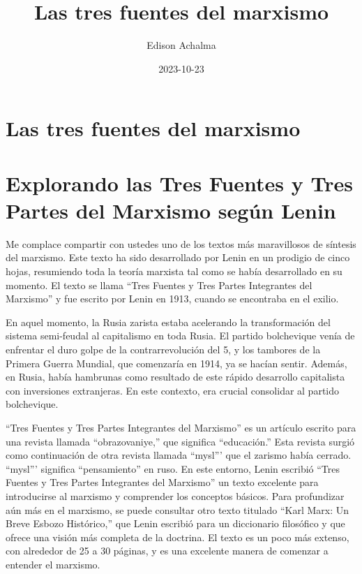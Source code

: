 \documentclass[
  jou,
  floatsintext,
  longtable,
  a4paper,
  nolmodern,
  notxfonts,
  notimes,
  12pt,
  colorlinks=true,linkcolor=blue,citecolor=blue,urlcolor=blue]{apa7}
\title{Las tres fuentes del marxismo}
\author{Edison Achalma}
\affiliation{
{Escuela Profesional de Economía, Universidad Nacional de San Cristóbal
de Huamanga}}
\date{2023-10-23}
\begin{document}
\maketitle


\hypertarget{toc}{}
\tableofcontents
\newpage
\section[Introduction]{Las tres fuentes del marxismo}

\setcounter{secnumdepth}{3}

\setlength\LTleft{0pt}




\section{Explorando las Tres Fuentes y Tres Partes del Marxismo según
Lenin}\label{explorando-las-tres-fuentes-y-tres-partes-del-marxismo-seguxfan-lenin}

Me complace compartir con ustedes uno de los textos más maravillosos de
síntesis del marxismo. Este texto ha sido desarrollado por Lenin en un
prodigio de cinco hojas, resumiendo toda la teoría marxista tal como se
había desarrollado en su momento. El texto se llama ``Tres Fuentes y
Tres Partes Integrantes del Marxismo'' y fue escrito por Lenin en 1913,
cuando se encontraba en el exilio.

En aquel momento, la Rusia zarista estaba acelerando la transformación
del sistema semi-feudal al capitalismo en toda Rusia. El partido
bolchevique venía de enfrentar el duro golpe de la contrarrevolución del
5, y los tambores de la Primera Guerra Mundial, que comenzaría en 1914,
ya se hacían sentir. Además, en Rusia, había hambrunas como resultado de
este rápido desarrollo capitalista con inversiones extranjeras. En este
contexto, era crucial consolidar al partido bolchevique.

``Tres Fuentes y Tres Partes Integrantes del Marxismo'' es un artículo
escrito para una revista llamada ``obrazovaniye,'' que significa
``educación.'' Esta revista surgió como continuación de otra revista
llamada ``mysl''' que el zarismo había cerrado. ``mysl''' significa
``pensamiento'' en ruso. En este entorno, Lenin escribió ``Tres Fuentes
y Tres Partes Integrantes del Marxismo'' un texto excelente para
introducirse al marxismo y comprender los conceptos básicos. Para
profundizar aún más en el marxismo, se puede consultar otro texto
titulado ``Karl Marx: Un Breve Esbozo Histórico,'' que Lenin escribió
para un diccionario filosófico y que ofrece una visión más completa de
la doctrina. El texto es un poco más extenso, con alrededor de 25 a 30
páginas, y es una excelente manera de comenzar a entender el marxismo.
\end{document}
